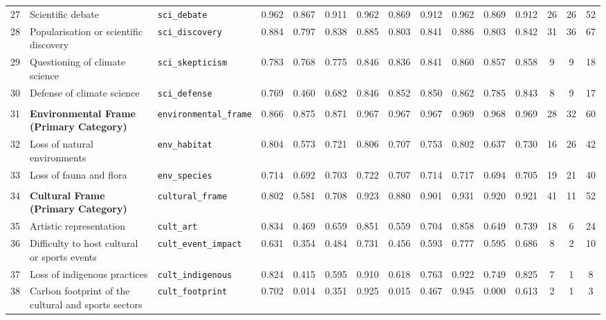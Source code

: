 \begin{longtable}{p{0.4cm}p{4.0cm}p{3.0cm}cccccccccccc}
\cmidrule(lr){1-15}
27 & Scientific debate & \texttt{sci\_debate} & 0.962 & 0.867 & 0.911 & 0.962 & 0.869 & 0.912 & 0.962 & 0.869 & 0.912 & 26 & 26 & 52 \\
28 & Popularisation or scientific discovery & \texttt{sci\_discovery} & 0.884 & 0.797 & 0.838 & 0.885 & 0.803 & 0.841 & 0.886 & 0.803 & 0.842 & 31 & 36 & 67 \\
29 & Questioning of climate science & \texttt{sci\_skepticism} & 0.783 & 0.768 & 0.775 & 0.846 & 0.836 & 0.841 & 0.860 & 0.857 & 0.858 & 9 & 9 & 18 \\
30 & Defense of climate science & \texttt{sci\_defense} & 0.769 & 0.460 & 0.682 & 0.846 & 0.852 & 0.850 & 0.862 & 0.785 & 0.843 & 8 & 9 & 17 \\
\midrule
\rowcolor{gray!8}
\multicolumn{15}{l}{\textit{Environmental Frame}} \\
\midrule
31 & \textbf{Environmental Frame\newline (Primary Category)} & \texttt{environmental\_frame} & 0.866 & 0.875 & 0.871 & 0.967 & 0.967 & 0.967 & 0.969 & 0.968 & 0.969 & 28 & 32 & 60 \\
\cmidrule(lr){1-15}
32 & Loss of natural environments & \texttt{env\_habitat} & 0.804 & 0.573 & 0.721 & 0.806 & 0.707 & 0.753 & 0.802 & 0.637 & 0.730 & 16 & 26 & 42 \\
33 & Loss of fauna and flora & \texttt{env\_species} & 0.714 & 0.692 & 0.703 & 0.722 & 0.707 & 0.714 & 0.717 & 0.694 & 0.705 & 19 & 21 & 40 \\
\midrule
\rowcolor{gray!8}
\multicolumn{15}{l}{\textit{Cultural Frame}} \\
\midrule
34 & \textbf{Cultural Frame\newline (Primary Category)} & \texttt{cultural\_frame} & 0.802 & 0.581 & 0.708 & 0.923 & 0.880 & 0.901 & 0.931 & 0.920 & 0.921 & 41 & 11 & 52 \\
\cmidrule(lr){1-15}
35 & Artistic representation & \texttt{cult\_art} & 0.834 & 0.469 & 0.659 & 0.851 & 0.559 & 0.704 & 0.858 & 0.649 & 0.739 & 18 & 6 & 24 \\
36 & Difficulty to host cultural or sports events & \texttt{cult\_event\_impact} & 0.631 & 0.354 & 0.484 & 0.731 & 0.456 & 0.593 & 0.777 & 0.595 & 0.686 & 8 & 2 & 10 \\
37 & Loss of indigenous practices & \texttt{cult\_indigenous} & 0.824 & 0.415 & 0.595 & 0.910 & 0.618 & 0.763 & 0.922 & 0.749 & 0.825 & 7 & 1 & 8 \\
38 & Carbon footprint of the cultural and sports sectors & \texttt{cult\_footprint} & 0.702 & 0.014 & 0.351 & 0.925 & 0.015 & 0.467 & 0.945 & 0.000 & 0.613 & 2 & 1 & 3 \\

\end{longtable}

